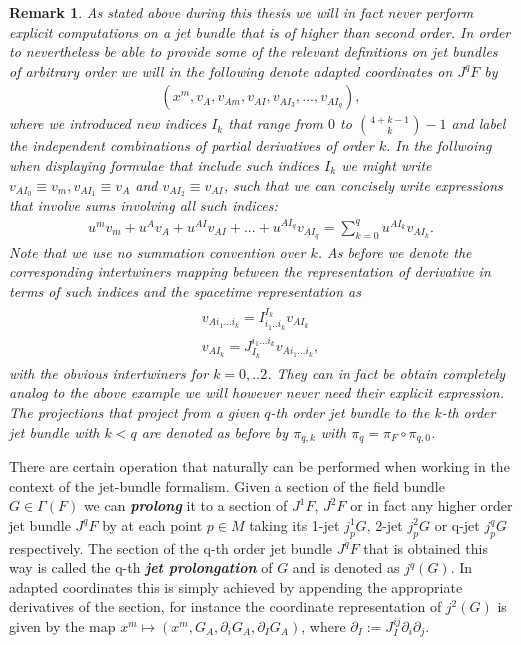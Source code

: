 \documentclass[a4paper,12pt, DIV=14, BCOR=5mm, twoside, headsepline]{scrbook}
\newtheorem*{remark}{Remark}
\begin{document}
\begin{remark}
As stated above during this thesis we will in fact never perform explicit computations on a jet bundle that is of higher than second order. In order to nevertheless be able to provide some of the relevant definitions on jet bundles of arbitrary order we will in the following denote adapted coordinates on $J^qF$ by 
\begin{align}
(x^m,v_A,v_{Am},v_{AI},v_{AI_{3}},...,v_{AI_{q}}),
\end{align}
where we introduced new indices $I_k$ that range from $0$ to $\binom{4+k-1}{k}-1$ and label the independent combinations of partial derivatives of order $k$. In the follwoing when displaying formulae that include such indices $I_k$ we might write $v_{AI_0} \equiv v_m, v_{AI_1} \equiv v_A$ and $v_{AI_2} \equiv v_{AI}$, such that we can concisely write expressions that involve sums involving all such indices:
\begin{align}
    u^mv_m + u^Av_A + u^{AI}v_{AI} + ... + u^{AI_q}v_{AI_q} = \sum _{k = 0}^q u^{AI_k}v_{AI_k}.
\end{align}
Note that we use no summation convention over $k$.
As before we denote the corresponding intertwiners mapping between the representation of derivative in terms of such indices and the spacetime representation as
\begin{align}
    \begin{aligned}
    v_{Ai_1...i_k} = I^{I_k}_{i_1..i_k} v_{AI_k}\\
    v_{AI_k} = J_{I_k}^{i_1...i_k} v_{Ai_1...i_k},
    \end{aligned}
\end{align}
with the obvious intertwiners for $k=0,..2$.
They can in fact be obtain completely analog to the above example we will however never need their explicit expression. 
The projections that project from a given $q$-th order jet bundle to the $k$-th order jet bundle with $k< q$ are denoted as before by $\pi_{q,k}$ with $\pi_q = \pi_F \circ \pi_{q,0}$.
\end{remark}

There are certain operation that naturally can be performed when working in the context of the jet-bundle formalism.
Given a section of the field bundle $G \in \Gamma(F)$ we can \textit{\textbf{prolong}} it to a section of $J^1F$, $J^2F$ or in fact any higher order jet bundle $J^qF$ by at each point $p \in M$ taking its 1-jet $j^1_pG$, 2-jet $j^2_pG$ or  q-jet $j^q_pG$ respectively. The section of the q-th order jet bundle $J^qF$ that is obtained this way is called the q-th \textbf{\textit{jet prolongation}} of $G$ and is denoted as $j^q(G)$. In adapted coordinates this is simply achieved by appending the appropriate derivatives of the section, for instance the coordinate representation of $j^2(G)$ is given by the map $x^m \mapsto (x^m, G_A, \partial_i G_A, \partial_I G_A)$, where $\partial_I := J_I^{ij} \partial_i \partial_j$.
\end{document}
